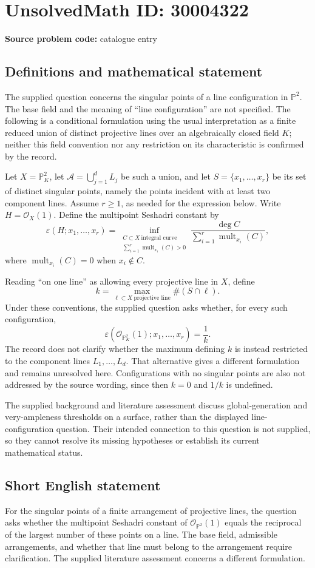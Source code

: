 \documentclass[11pt]{article}
\newcommand{\PP}{\mathbb{P}}
\begin{document}
\section*{UnsolvedMath ID: 30004322}
\textbf{Source problem code:} catalogue entry
\subsection{Definitions and mathematical statement}
The supplied question concerns the singular points of a line configuration in $\PP^2$. The base field and the meaning of ``line configuration'' are not specified. The following is a conditional formulation using the usual interpretation as a finite reduced union of distinct projective lines over an algebraically closed field $K$; neither this field convention nor any restriction on its characteristic is confirmed by the record.

Let $X=\PP^2_K$, let $\mathcal A=\bigcup_{j=1}^{d}L_j$ be such a union, and let $S=\{x_1,\ldots,x_r\}$ be its set of distinct singular points, namely the points incident with at least two component lines. Assume $r\geq 1$, as needed for the expression below. Write $H=\mathcal O_X(1)$. Define the multipoint Seshadri constant by
\[
\varepsilon(H;x_1,\ldots,x_r)
=
\inf_{\substack{C\subset X\ \text{integral curve}\\ \sum_{i=1}^{r}\operatorname{mult}_{x_i}(C)>0}}
\frac{\deg C}{\sum_{i=1}^{r}\operatorname{mult}_{x_i}(C)},
\]
where $\operatorname{mult}_{x_i}(C)=0$ when $x_i\notin C$.

Reading ``on one line'' as allowing every projective line in $X$, define
\[
k=\max_{\ell\subset X\ \text{projective line}}\#(S\cap\ell).
\]
Under these conventions, the supplied question asks whether, for every such configuration,
\[
\varepsilon(\mathcal O_{\PP^2_K}(1);x_1,\ldots,x_r)=\frac{1}{k}.
\]
The record does not clarify whether the maximum defining $k$ is instead restricted to the component lines $L_1,\ldots,L_d$. That alternative gives a different formulation and remains unresolved here. Configurations with no singular points are also not addressed by the source wording, since then $k=0$ and $1/k$ is undefined.

The supplied background and literature assessment discuss global-generation and very-ampleness thresholds on a surface, rather than the displayed line-configuration question. Their intended connection to this question is not supplied, so they cannot resolve its missing hypotheses or establish its current mathematical status.
\subsection{Short English statement}
For the singular points of a finite arrangement of projective lines, the question asks whether the multipoint Seshadri constant of $\mathcal O_{\PP^2}(1)$ equals the reciprocal of the largest number of these points on a line. The base field, admissible arrangements, and whether that line must belong to the arrangement require clarification. The supplied literature assessment concerns a different formulation.
\end{document}
